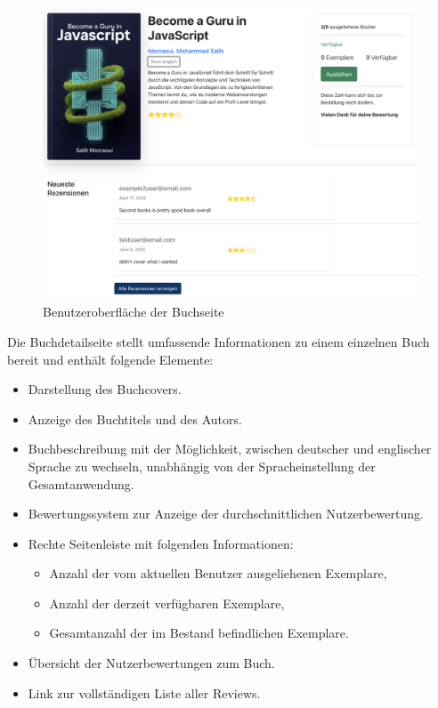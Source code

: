 \begin{figure}[H]
	\centering
	\includegraphics[width=1.0\textwidth]{images/UI-screenshots/Book-Page.png}
	\caption{Benutzeroberfläche der Buchseite}
	\label{fig:Book-page}
\end{figure}

\noindent Die Buchdetailseite stellt umfassende Informationen zu einem einzelnen Buch bereit und enthält folgende Elemente:
\begin{itemize}
	\item Darstellung des Buchcovers.
	\item Anzeige des Buchtitels und des Autors.
	\item Buchbeschreibung mit der Möglichkeit, zwischen deutscher und englischer Sprache zu wechseln, unabhängig von der Spracheinstellung der Gesamtanwendung.
	\item Bewertungssystem zur Anzeige der durchschnittlichen Nutzerbewertung.
	\item Rechte Seitenleiste mit folgenden Informationen:
	\begin{itemize}
		\item Anzahl der vom aktuellen Benutzer ausgeliehenen Exemplare,
		\item Anzahl der derzeit verfügbaren Exemplare,
		\item Gesamtanzahl der im Bestand befindlichen Exemplare.
	\end{itemize}
	\item Übersicht der Nutzerbewertungen zum Buch.
	\item Link zur vollständigen Liste aller Reviews.
\end{itemize}

